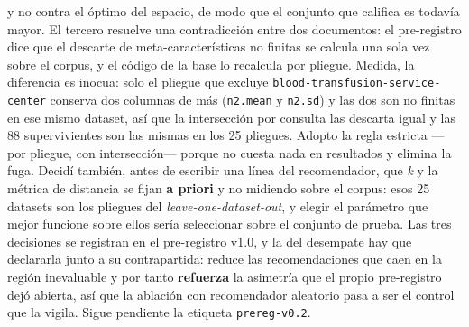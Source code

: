 \documentclass[11pt,letterpaper]{article}
\begin{document}
{ y no contra el óptimo del espacio, de modo que el conjunto que califica es todavía
 mayor. El tercero resuelve una contradicción entre dos documentos: el pre-registro
 dice que el descarte de meta-características no finitas se calcula una sola vez sobre
 el corpus, y el código de la base lo recalcula por pliegue. Medida, la diferencia es
 inocua: solo el pliegue que excluye \texttt{blood-transfusion-service-center} conserva
 dos columnas de más (\texttt{n2.mean} y \texttt{n2.sd}) y las dos son no finitas en
 ese mismo dataset, así que la intersección por consulta las descarta igual y las 88
 supervivientes son las mismas en los 25 pliegues. Adopto la regla estricta —por
 pliegue, con intersección— porque no cuesta nada en resultados y elimina la fuga.
 Decidí también, antes de escribir una línea del recomendador, que \emph{k} y la
 métrica de distancia se fijan \textbf{a priori} y no midiendo sobre el corpus: esos 25
 datasets son los pliegues del \textit{leave-one-dataset-out}, y elegir el parámetro
 que mejor funcione sobre ellos sería seleccionar sobre el conjunto de prueba. Las tres
 decisiones se registran en el pre-registro v1.0, y la del desempate hay que declararla
 junto a su contrapartida: reduce las recomendaciones que caen en la región inevaluable
 y por tanto \textbf{refuerza} la asimetría que el propio pre-registro dejó abierta,
 así que la ablación con recomendador aleatorio pasa a ser el control que la vigila.
 Sigue pendiente la etiqueta \texttt{prereg-v0.2}.}
\end{document}

